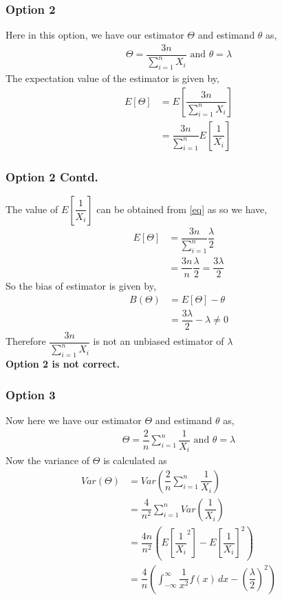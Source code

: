 \documentclass{beamer}
\providecommand{\brak}[1]{\ensuremath{\left(#1\right)}}
\begin{document}
\begin{frame}
\frametitle{Option 2}
Here in this option, we have our estimator $ \Theta$ and estimand $ \theta $ as,
 \begin{align}
     \Theta = \dfrac{3n}{\sum_{i=1}^{n} X_i } \text{  and  }
     \theta = \lambda
 \end{align}
 The expectation value of the estimator is given by, 
\begin{align}
    E[\Theta ] &= E  \left[   \dfrac{3n}{\sum_{i=1}^{n} X_i }  \right] \\
    & = \dfrac{3n}{\sum_{i=1}^{n}}  E  \left[ \dfrac{1}{X_i}  \right] 
\end{align}
\end{frame}
\begin{frame}
   \frametitle{Option 2 Contd.} 
The value of $  E  \left[ \dfrac{1}{X_i}  \right]  $ can be obtained from \eqref{eq} as so we have,
\begin{align}
     E[\Theta ] &= \dfrac{3n}{\sum_{i=1}^{n}} \dfrac{\lambda}{2} \\
     &= \dfrac{3n}{n} \dfrac{\lambda}{2}
     = \dfrac{3\lambda}{2}
\end{align}
So the bias of estimator is given by,
\begin{align}
    B(\Theta) &= E[\Theta] - \theta  \\
    &= \dfrac{3\lambda}{2}- \lambda  \neq 0
    \label{eqbias2}
\end{align}
Therefore $ \dfrac{3n}{\sum_{i=1}^{n} X_i } $ is not an unbiased estimator of $ \lambda$ \\
\textbf{Option 2 is not correct.}
\end{frame}

 \begin{frame}
 \frametitle{Option 3}
    Now here we have our estimator $ \Theta$ and estimand $ \theta $ as,
 \begin{align}
     \Theta = \dfrac{2}{n} \sum_{i=1}^{n} \dfrac{1}{X_i} \text{  and  }
     \theta = \lambda
 \end{align}  
 Now the variance of $ \Theta$ is calculated as
\begin{align}
    Var(\Theta) &= Var\brak{\dfrac{2}{n} \sum_{i=1}^{n} \dfrac{1}{X_i} } \\
    & = \dfrac{4}{n^2} \sum_{i=1}^{n} Var\brak{\dfrac{1}{X_i}} \\
    \label{eq3}
    & = \dfrac{4n}{n^2} \brak{E  \left[ {\dfrac{1}{X_i}}^2  \right] - {E  \left[ {\dfrac{1}{X_i}}  \right]}^2 } \\
    & = \dfrac{4}{n} \brak{ \int_{-\infty}^{\infty} \dfrac{1}{x^2} f(x)\,dx  - \brak{\dfrac{\lambda}{2}}^2 } 
\end{align}
\end{frame}
\end{document}
